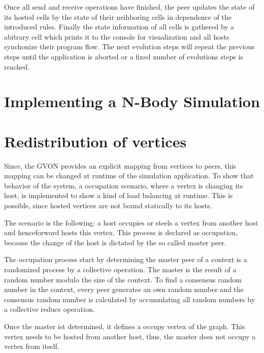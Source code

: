 Once all send and receive operations have finished, the peer updates
the state of its hosted cells by the state of their neihboring cells
in dependence of the introduced rules. Finally the state information
of all cells is gathered by a abitrary cell which prints it to the
console for visualization and all hosts synchonize their program flow.
The next evolution steps will repeat the previous steps until the
application is aborted or a fixed number of evolutions steps is
reached.

\section{Implementing a N-Body Simulation}

\section{Redistribution of vertices}

Since, the GVON provides an explicit mapping from vertices to peers,
this mapping can be changed at runtime of the simulation application.
To show that behavior of the system, a occupation scenario, where a
vertex is changing its host, is implemented to show a kind of load
balancing at runtime. This is possible, since hosted vertices are not
bound statically to its hosts.

The scenario is the following: a host occupies or steels a vertex
from another host and henceforward hosts this vertex.  This process
is declared as occupation, because the change of the host is
dictated by the so called master peer.

The occupation process start by determining the master peer of a
context is a randomized process by a collective operation. The
master is the result of a random number modulo the size of the
context. To find a consensus random number in the context, every
peer generates an own random number and the consensus random number
is calculated by accumulating all random numbers by a collective
reduce operation.

Once the master ist determined, it defines a occupy vertex of the
graph. This vertex needs to be hosted from another host, thus,
the master does not occupy a vertex from itself.

